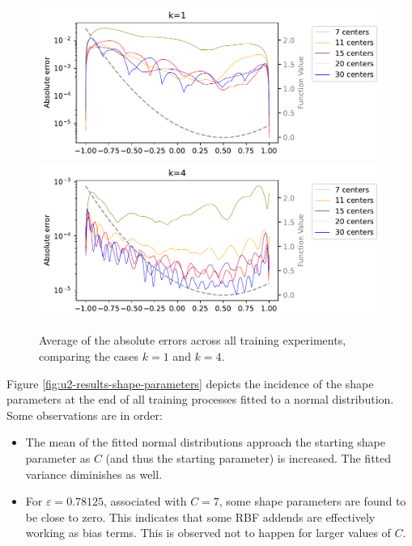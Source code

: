 \documentclass[12pt]{report} %
\begin{document}
\begin{figure}
  \includegraphics[width=\textwidth]{imagenes/experiments/1d/statistical_1d_full_scheduler_interpolation/u2_30_1}
  \includegraphics[width=\textwidth]{imagenes/experiments/1d/statistical_1d_full_scheduler_interpolation/u2_30_4}
  \caption{Average of the absolute errors across all training experiments, comparing the cases $k=1$ and $k=4$.}
  \label{fig:u2-results-largest-error}
\end{figure}

Figure \ref{fig:u2-results-shape-parameters} depicts the incidence of the shape parameters at the end of all training processes fitted to a normal distribution. Some observations are in order:
\begin{itemize}
  \item The mean of the fitted normal distributions approach the starting shape parameter as $C$ (and thus the starting parameter) is increased. The fitted variance diminishes as well.
  \item For $\varepsilon=0.78125$, associated with $C=7$, some shape parameters are found to be close to zero. This indicates that some RBF addends are effectively working as bias terms. This is observed not to happen for larger values of $C$.
\end{itemize}
\end{document}
